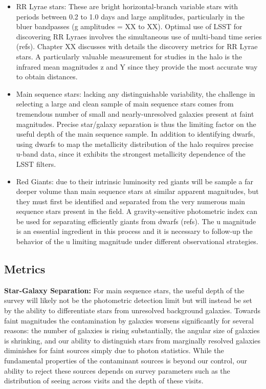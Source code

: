 \begin{itemize}

\item RR Lyrae stars: These are bright horizontal-branch variable stars with
periods between 0.2 to 1.0 days and large amplitudes, particularly in the bluer 
bandpasses (g amplitudes = XX to XX). Optimal use of LSST for discovering
RR Lyraes involves the simultaneous use of multi-band time series (refs).
Chapter XX discusses with details the discovery metrics for RR Lyrae stars.
A particularly valuable measurement for studies in the halo is the infrared mean
magnitudes z and Y since they provide the most accurate way to obtain 
distances.

\item Main sequence stars: lacking any distinguishable variability, the
challenge in selecting a large and clean sample of main sequence stars comes
from tremendous number of small and nearly-unresolved galaxies present at
faint magnitudes. Precise star/galaxy separation is thus the limiting factor
on the useful depth of the main sequence sample. In addition to identifying
dwarfs, using dwarfs to map the metallicity distribution of the halo requires
precise u-band data, since it exhibits the strongest metallicity dependence of
the LSST filters.

\item Red Giants: due to their intrinsic luminosity red giants will be sample
a far deeper volume than main sequence stars at similar apparent magnitudes,
but they must first be identified and separated from the very numerous main
sequence stars present in the field. A gravity-sensitive photometric index can
be used for separating efficiently giants from dwarfs (refs). The u magnitude
is an essential ingredient in this process and it is necessary to follow-up
the behavior of the u limiting magnitude under different observational
strategies.

\end{itemize}


\subsection{Metrics}
\label{sec:keyword:MW_Halo_metrics}

\textbf{Star-Galaxy Separation:} For main sequence stars, the useful depth of
the survey will likely not be the photometric detection limit but will instead
be set by the ability to differentiate stars from unresolved background
galaxies. Towards faint magnitudes the contamination by galaxies worsens
significantly for several reasons: the number of galaxies is rising
substantially, the angular size of galaxies is shrinking, and our ability to
distinguish stars from marginally resolved galaxies diminishes for faint
sources simply due to photon statistics. While the fundamental properties of
the contaminant sources is beyond our control, our ability to reject these
sources depends on survey parameters such as the distribution of seeing across
visits and the depth of these visits.

